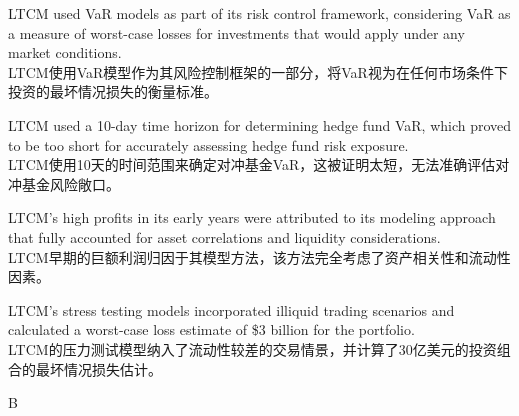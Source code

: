 \documentclass{article}
\begin{document}
\begin{choices}
    \item LTCM used VaR models as part of its risk control framework, considering VaR as a measure of worst-case losses for investments that would apply under any market conditions. \\
    LTCM使用VaR模型作为其风险控制框架的一部分，将VaR视为在任何市场条件下投资的最坏情况损失的衡量标准。

    \item LTCM used a 10-day time horizon for determining hedge fund VaR, which proved to be too short for accurately assessing hedge fund risk exposure. \\
    LTCM使用10天的时间范围来确定对冲基金VaR，这被证明太短，无法准确评估对冲基金风险敞口。

    \item LTCM's high profits in its early years were attributed to its modeling approach that fully accounted for asset correlations and liquidity considerations. \\
    LTCM早期的巨额利润归因于其模型方法，该方法完全考虑了资产相关性和流动性因素。

    \item LTCM's stress testing models incorporated illiquid trading scenarios and calculated a worst-case loss estimate of \$3 billion for the portfolio. \\
    LTCM的压力测试模型纳入了流动性较差的交易情景，并计算了30亿美元的投资组合的最坏情况损失估计。
\end{choices}



\begin{correctanswer}
    B
\end{correctanswer}
\end{document}
